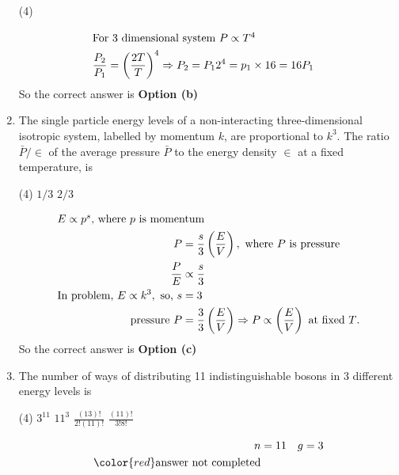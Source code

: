 \begin{enumerate}
	{}
	\begin{tasks}(4)
	\end{tasks}
\begin{answer}
	\begin{align*}
	\intertext{For 3 dimensional system $P \propto T^{4}$}
	\frac{P_{2}}{P_{1}}&=\left(\frac{2 T}{T}\right)^{4} \Rightarrow P_{2}=P_{1} 2^{4}=p_{1} \times 16=16 P_{1}
	\end{align*}
	So the correct answer is \textbf{Option (b)}
\end{answer}
	\item The single particle energy levels of a non-interacting three-dimensional isotropic system, labelled by momentum $k$, are proportional to $k^{3}$. The ratio $\bar{P} / \in$ of the average pressure $\bar{P}$ to the energy density $\in$ at a fixed temperature, is
	{}
	\begin{tasks}(4)
		\task[\textbf{a.}] $1 / 3$
		\task[\textbf{b.}] $2 / 3$
	\end{tasks}
\begin{answer}
	\begin{align*}
	\intertext{$E \propto p^{s}$, where $p$ is momentum}
	P&=\frac{s}{3}\left(\frac{E}{V}\right),\text{ where $P$ is pressure}\\
	\frac{P}{E} &\propto \frac{s}{3}\\
	\text{In problem, }E \propto k^{3},\text{ so, }s&=3\\
	\text{	pressure }P&=\frac{3}{3}\left(\frac{E}{V}\right) \Rightarrow P \propto\left(\frac{E}{V}\right)\text{ at fixed $T$.}
	\end{align*}
	So the correct answer is \textbf{Option (c)}
\end{answer}
	\item The number of ways of distributing 11 indistinguishable bosons in 3 different energy levels is
	{}
	\begin{tasks}(4)
		\task[\textbf{a.}]  $3^{11}$
		\task[\textbf{b.}] $11^{3}$
		\task[\textbf{c.}] $\frac{(13) !}{2 !(11) !}$
		\task[\textbf{d.}]  $\frac{(11) !}{3 ! 8 !}$
	\end{tasks}
\begin{answer}
	\begin{align*}
	n&=11 \quad g=3\\
	\color{red}\text{answer not completed}
	\end{align*}

\end{answer}
\end{enumerate}
